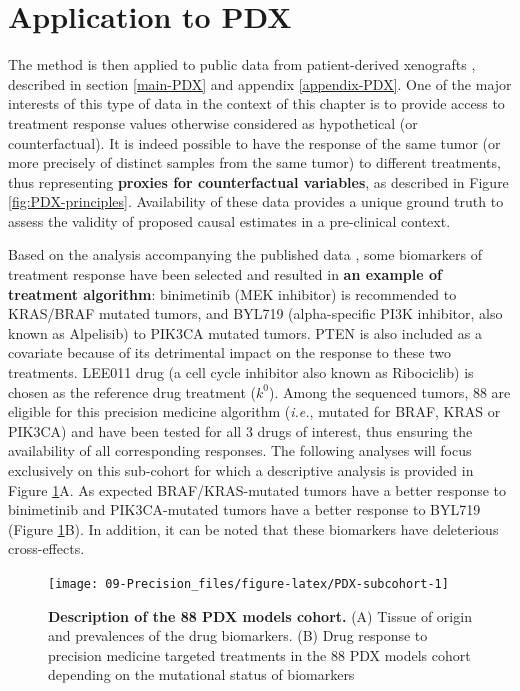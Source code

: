 \documentclass[a4paper,12pt,twoside,onecolumn,openright,final,oldfontcommands]{memoir}
\begin{document}
\section{Application to PDX}\label{application-to-pdx}

The method is then applied to public data from patient-derived
xenografts \citep{gao2015high}, described in section \ref{main-PDX} and
appendix \ref{appendix-PDX}. One of the major interests of this type of
data in the context of this chapter is to provide access to treatment
response values otherwise considered as hypothetical (or
counterfactual). It is indeed possible to have the response of the same
tumor (or more precisely of distinct samples from the same tumor) to
different treatments, thus representing \textbf{proxies for
counterfactual variables}, as described in Figure
\ref{fig:PDX-principles}. Availability of these data provides a unique
ground truth to assess the validity of proposed causal estimates in a
pre-clinical context.

Based on the analysis accompanying the published data
\citep{gao2015high}, some biomarkers of treatment response have been
selected and resulted in \textbf{an example of treatment algorithm}:
binimetinib (MEK inhibitor) is recommended to KRAS/BRAF mutated tumors,
and BYL719 (alpha-specific PI3K inhibitor, also known as Alpelisib) to
PIK3CA mutated tumors. PTEN is also included as a covariate because of
its detrimental impact on the response to these two treatments. LEE011
drug (a cell cycle inhibitor also known as Ribociclib) is chosen as the
reference drug treatment (\(k^0\)). Among the sequenced tumors, 88 are
eligible for this precision medicine algorithm (\emph{i.e.}, mutated for
BRAF, KRAS or PIK3CA) and have been tested for all 3 drugs of interest,
thus ensuring the availability of all corresponding responses. The
following analyses will focus exclusively on this sub-cohort for which a
descriptive analysis is provided in Figure \ref{fig:PDX-subcohort}A. As
expected BRAF/KRAS-mutated tumors have a better response to binimetinib
and PIK3CA-mutated tumors have a better response to BYL719 (Figure
\ref{fig:PDX-subcohort}B). In addition, it can be noted that these
biomarkers have deleterious cross-effects.

\begin{figure}

{\centering \texttt{[image: 09-Precision\_files/figure-latex/PDX-subcohort-1]} 

}

\caption[Description of the 88 PDX models cohort]{\textbf{Description of the 88 PDX models
cohort.} (A) Tissue of origin and prevalences of the drug biomarkers.
(B) Drug response to precision medicine targeted treatments in the 88
PDX models cohort depending on the mutational status of biomarkers}\label{fig:PDX-subcohort}
\end{figure}
\end{document}
